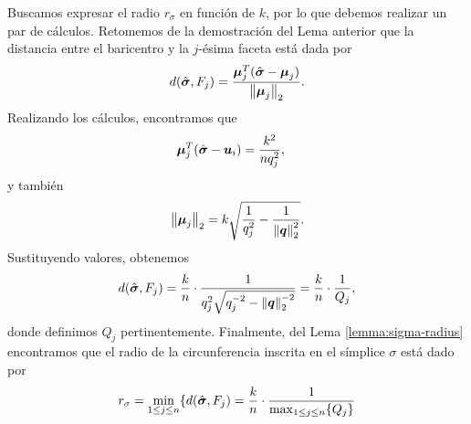 Buscamos expresar el radio $r_\sigma$ en función de $k$, por lo que debemos realizar un par de
cálculos. Retomemos de la demostración del Lema anterior que la distancia entre el baricentro y la
$j$-ésima faceta está dada por
\begin{equation*}
	d(\hat{\boldsymbol{ \sigma }}, F_j) = \frac{{\boldsymbol{\mu}}_j^T(\hat{\boldsymbol{ \sigma }} - \boldsymbol{\mu}_j)}{\left\lVert \boldsymbol{\mu}_j \right\rVert_2}.
\end{equation*}
Realizando los cálculos, encontramos que
\begin{align*}
	\boldsymbol{\mu}_j^T(\hat{\boldsymbol{ \sigma }} - \boldsymbol{u}_i)
	&= \frac{k^2}{nq_j^2},
\end{align*}
y también
\begin{equation*}
	\left\lVert \boldsymbol{\mu}_j \right\rVert_2 = k \sqrt{\frac{1}{q_j^2} - \frac{1}{\left\lVert \boldsymbol{q} \right\rVert_2^2}}.
\end{equation*}
Sustituyendo valores, obtenemos
\begin{equation*}
	d(\hat{\boldsymbol{ \sigma }}, F_j) = \frac{k}{n} \cdot
	\frac{1}{q_j^2\sqrt{q_j^{-2} - \left\lVert \boldsymbol{q} \right\rVert_2^{-2}}}
	= \frac{k}{n} \cdot \frac{1}{Q_j},
\end{equation*}
donde definimos $Q_j$ pertinentemente. Finalmente, del Lema \ref{lemma:sigma-radius} encontramos que
el radio de la circunferencia inscrita en el símplice $\sigma$ está dado por
\begin{equation}
	\label{eq:sigma-radius}
	r_\sigma = \min_{1 \leq j \leq n} \lbrace d(\hat{\boldsymbol{ \sigma }}, F_j) = \frac{k}{n} \cdot
	\frac{1}{\max_{1 \leq j \leq n} \lbrace Q_j \rbrace}
\end{equation}

